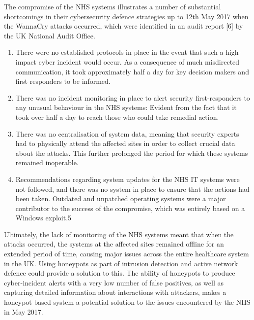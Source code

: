 	The compromise of the NHS systems illustrates a number of substantial shortcomings in their cybersecurity defence strategies up to 12th May 2017 when the WannaCry attacks occurred, which were identified in an audit report [6] by the UK National Audit Office. 
	
	\begin{enumerate}
		\item There were no established protocols in place in the event that such a high-impact cyber incident would occur. As a consequence of much misdirected communication, it took approximately half a day for key decision makers and first responders to be informed. 
		
		\item There was no incident monitoring in place to alert security first-responders to any unusual behaviour in the NHS systems: Evident from the fact that it took over half a day to reach those who could take remedial action. 
		
		\item There was no centralisation of system data, meaning that security experts had to physically attend the affected sites in order to collect crucial data about the attacks. This further prolonged the period for which these systems remained inoperable. 
	
		\item Recommendations regarding system updates for the NHS IT systems were not followed, and there was no system in place to ensure that the actions had been taken. Outdated and unpatched operating systems were a major contributor to the success of the compromise, which was entirely based on a Windows exploit.5
	
	\end{enumerate}
	
	Ultimately, the lack of monitoring of the NHS systems meant that when the attacks occurred, the systems at the affected sites remained offline for an extended period of time, causing major issues across the entire healthcare system in the UK. Using honeypots as part of  intrusion detection and active network defence could provide a solution to this. The ability of honeypots to produce cyber-incident alerts with a very low number of false positives, as well as capturing detailed information about interactions with attackers, makes a honeypot-based system a potential solution to the issues encountered by the NHS in May 2017.

